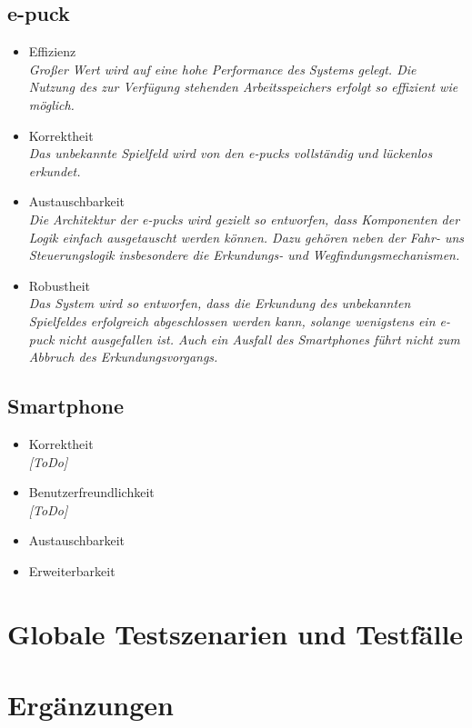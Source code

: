 \documentclass[10pt,a4paper]{article}
\begin{document}
		\subsection{e-puck}
			\begin{itemize}
				\item Effizienz
					\\ \textsl{Großer Wert wird auf eine hohe Performance des Systems gelegt. Die Nutzung des zur Verfügung stehenden
						Arbeitsspeichers erfolgt so effizient wie möglich.}
				\item Korrektheit
					\\ \textsl{Das unbekannte Spielfeld wird von den e-pucks vollständig und lückenlos erkundet.}
				\item Austauschbarkeit
					\\ \textsl{Die Architektur der e-pucks wird gezielt so entworfen, dass Komponenten der Logik einfach ausgetauscht
						werden können.
						Dazu gehören neben der Fahr- uns Steuerungslogik insbesondere die Erkundungs- und Wegfindungsmechanismen.}						
				\item Robustheit 
					\\ \textsl{Das System wird so entworfen, dass die Erkundung des unbekannten Spielfeldes erfolgreich abgeschlossen
						werden kann, solange wenigstens ein e-puck nicht ausgefallen ist.
						Auch ein Ausfall des Smartphones führt nicht zum Abbruch des Erkundungsvorgangs.
						}					
			\end{itemize}		
		
		\subsection{Smartphone}
			\begin{itemize}
				\item Korrektheit
					\\ \textsl{[ToDo]}
				\item Benutzerfreundlichkeit
					\\ \textsl{[ToDo]}
				\item Austauschbarkeit
					\\ \textsl{}						
				\item Erweiterbarkeit
					\\ \textsl{}					
			\end{itemize}
	
	\section{Globale Testszenarien und Testfälle}	
	
	\section{Ergänzungen}
						
\end{document}
